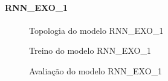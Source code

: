 \documentclass[	12pt, Times, openright, twoside, a4paper, english, brazil]{abntex2}
\begin{document}
              \paragraph{RNN\_EXO\_1}
                \begin{figure}[!ht]
                  \caption{Topologia do modelo RNN\_EXO\_1 \label{fig:case1_rnn_exo_1} }
                \end{figure}

                \begin{figure}[!ht]
                  \caption{Treino do modelo RNN\_EXO\_1 \label{fig:case1_rnn_exo_1_train} }
                \end{figure}

                \begin{figure}[!ht]
                  \caption{Avaliação do modelo RNN\_EXO\_1 \label{fig:case1_rnn_exo_1_val} }
                \end{figure}
                
\end{document}
